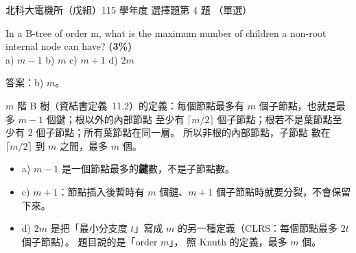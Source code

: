 \begin{pastexam}[label={px:ntut-115-ee-ds-14}]{北科大電機所（戊組）115 學年度 選擇題第 4 題}
（單選）

In a B-tree of order m, what is the maximum number of children a non-root internal node can have?
\textbf{(3\%)}\\
a) $m-1$ \qquad b) $m$ \qquad c) $m+1$ \qquad d) $2m$
\end{pastexam}

\begin{pastsoln}
答案：b) $m$。

$m$ 階 B 樹（資結書定義~11.2）的定義：每個節點最多有 $m$ 個子節點，也就是最多 $m - 1$ 個鍵；根以外的內部節點
至少有 $\lceil m/2 \rceil$ 個子節點；根若不是葉節點至少有 $2$ 個子節點；所有葉節點在同一層。 所以非根的內部節點，子節點
數在 $\lceil m/2 \rceil$ 到 $m$ 之間，最多 $m$ 個。
\begin{itemize}
\item a) $m - 1$ 是一個節點最多的\textbf{鍵}數，不是子節點數。
\item c) $m + 1$：節點插入後暫時有 $m$ 個鍵、$m + 1$ 個子節點時就要分裂，不會保留下來。
\item d) $2m$ 是把「最小分支度 $t$」寫成 $m$ 的另一種定義（CLRS：每個節點最多 $2t$ 個子節點）。 題目說的是「order $m$」，
照 Knuth 的定義，最多 $m$ 個。
\end{itemize}
\end{pastsoln}
